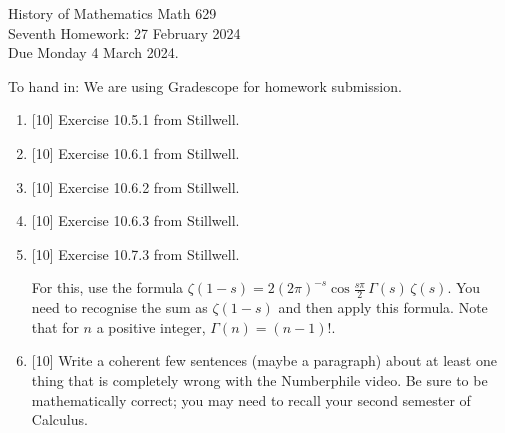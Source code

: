 \documentclass[12pt]{article}
\begin{document}
\LARGE 
\noindent
{\color{Maroon}History of Mathematics \hfill Math 629}\vspace{2pt}\\
\large
Seventh Homework: \hfill 27 February 2024\\
Due Monday 4 March 2024.
\normalsize\vspace{10pt}

To hand in: We are using Gradescope for homework submission.


\begin{enumerate}

\item  {[10]}
     Exercise 10.5.1 from Stillwell.

\item  {[10]}
     Exercise 10.6.1 from Stillwell.


\item  {[10]}
     Exercise 10.6.2 from Stillwell. 

\item  {[10]}
     Exercise 10.6.3 from Stillwell. 

 
\item  {[10]}
  Exercise 10.7.3 from Stillwell.

  For this, use the formula $\zeta(1-s) = 2 (2\pi)^{-s} \cos\frac{s\pi}{2}\,\Gamma(s)\, \zeta(s)$.
  You need to recognise the sum as $\zeta(1-s)$ and then apply this formula.  Note that for $n$ a positive integer, $\Gamma(n)=(n-1)!$.

 
\item  {[10]}
  Write a coherent few sentences (maybe a paragraph) about at least one thing that is completely wrong with the Numberphile video.
  Be sure to be mathematically correct; you may need to recall your second semester of Calculus.

\end{enumerate}
\end{document}
